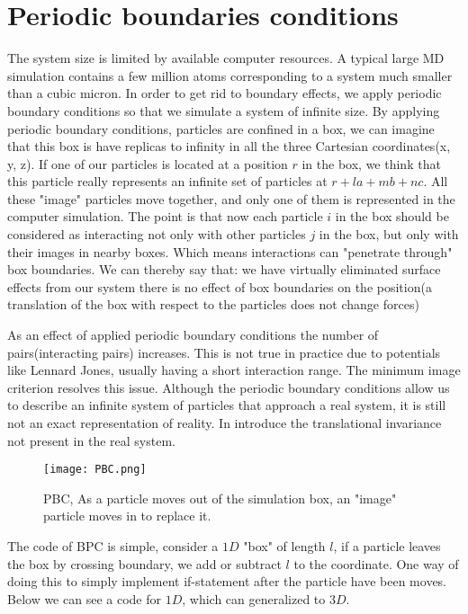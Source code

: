 \documentclass[a4paper]{article}
\begin{document}
\section{Periodic boundaries conditions}
The system size is limited by available computer resources. A typical large MD simulation contains a few million atoms corresponding to a system much smaller than a cubic micron. In order to get rid to boundary effects, we apply periodic boundary conditions so that we simulate a system of infinite size. By applying periodic boundary conditions, particles are confined in a box, we can imagine that this box is have replicas to infinity in all the  three Cartesian coordinates(x, y, z). If one of our particles is located at a position $r$ in the box, we think that this particle really represents an infinite set of particles at $r+la+mb+nc$. All these "image" particles  move together, and only one of them is represented in the computer simulation. The point is that now each particle $i$ in the box should be considered as interacting not only with other particles $j$ in the box, but only with their images in nearby boxes. Which means interactions can "penetrate through" box boundaries. We can thereby say that: 
we have virtually eliminated surface effects from our system
there is no effect of box boundaries on the position(a translation of the box with respect to the particles does not change forces)

As an effect of applied periodic boundary conditions the number of pairs(interacting pairs) increases. This is not true in practice due to potentials like Lennard Jones, usually having a short interaction range. The minimum image criterion resolves this issue. Although the periodic boundary conditions allow us to describe an infinite system of particles that approach a real system, it is still not an exact representation of reality. In introduce the translational invariance not present in the real system. 

\begin{figure}[!h]
\centering
\texttt{[image: PBC.png]}
\caption{\label{fig:PBC}PBC, As a particle moves out of the simulation box, an "image" particle moves in to replace it.}
\end{figure}

The code of BPC is simple, consider a $1D$ "box" of length $l$, if a particle leaves the box by crossing boundary, we add or subtract $l$ to the coordinate. One way of doing this to simply implement if-statement after the particle have been moves. Below we can see a code for $1D$, which can generalized to $3D$. 
\end{document}
